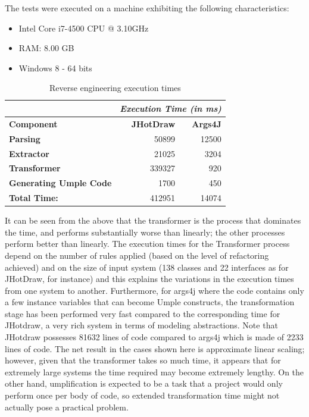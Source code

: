 The tests were executed on a machine exhibiting the following characteristics:
\begin{itemize}
\item Intel Core i7-4500 CPU @ 3.10GHz  
\item RAM: 8.00 GB 
\item Windows 8 - 64 bits
\end{itemize}

\begin{table}[h]
\caption{Reverse engineering execution times}
\label{table:executionTimes} 
\centering
\begin{tabular}{p{4cm}|rr}
\toprule
\rowcolor[HTML]{BBDAFF} 
  & \multicolumn{2}{l}{\textit{\textbf{Execution Time (in ms)}}} \\\hline
\textbf{Component}             & \textbf{JHotDraw}     & \textbf{Args4J}   \\\hline
\textbf{Parsing}               & 50899  & 12500         \\\hline
\textbf{Extractor}             & 21025  & 3204         \\\hline
\rowcolor{lightgray} 
\textbf{Transformer}           & 339327 & 920          \\\hline
\textbf{Generating Umple Code} & 1700   & 450          \\\hline
\textbf{Total Time:}           & 412951 & 14074        \\\hline
\end{tabular}
\end{table}


It can be seen from the above that the transformer is the process that dominates the time, and performs substantially worse than linearly; the other processes perform better than linearly. The execution times for the Transformer process depend on the number of rules applied (based on the level of refactoring achieved) and on the size of input system (138 classes and 22 interfaces as for JHotDraw, for instance) and this explains the variations in the execution times from one system to another. Furthermore, for args4j where the code contains only a few instance variables that can become Umple constructs, the transformation stage has been performed very fast compared to the corresponding time for JHotdraw, a very rich system in terms of modeling abstractions. Note that JHotdraw possesses 81632 lines of code compared to args4j which is made of 2233 lines of code. The net result in the cases shown here is approximate linear scaling; however, given that the transformer takes so much time, it appears that for extremely large systems the time required may become extremely lengthy. On the other hand, umplification is expected to be a task that a project would only perform once per body of code, so extended transformation time might not actually pose a practical problem.


